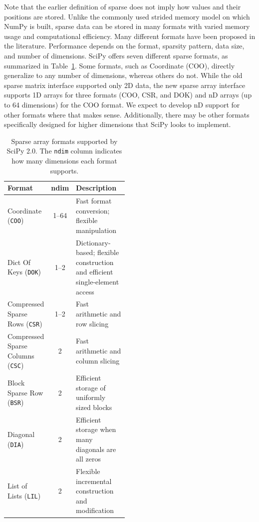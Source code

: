 \documentclass[acmsmall]{acmart}
\begin{document}
Note that the earlier definition of sparse does not imply how values and their
positions are stored.
Unlike the commonly used strided memory model on which NumPy is built,
sparse data can be stored in many formats with varied memory usage and
computational efficiency.
Many different formats have been proposed in the literature.
Performance depends on the format, sparsity pattern, data size, and number of
dimensions. SciPy offers seven
different sparse formats, as summarized in Table~\ref{tab:sparse}.
Some formats, such as Coordinate (COO), directly generalize to any number of
dimensions, whereas others do not.
While the old sparse matrix interface supported only 2D data, the new sparse array
interface supports 1D arrays for three formats (COO, CSR, and DOK) and nD arrays
(up to 64 dimensions) for the COO format. We expect to develop nD support for other
formats where that makes sense. Additionally, there may be other formats specifically
designed for higher dimensions that SciPy looks to implement.

\begin{table}
  \centering
  \caption{Sparse array formats supported by SciPy 2.0.
  The \texttt{ndim} column indicates how many dimensions each format supports.}\label{tab:sparse}
  \begin{tabular}{lcp{0.48\linewidth}@{}}
    \toprule
    Format & ndim & Description \\
    \midrule
    Coordinate (\texttt{COO}) & 1--64 & Fast format conversion; flexible manipulation \\
    Dict Of Keys (\texttt{DOK}) & 1--2 & Dictionary-based; flexible construction and \newline efficient single-element access \\
    Compressed Sparse Rows (\texttt{CSR}) & 1--2 & Fast arithmetic and row slicing \\
    Compressed Sparse Columns (\texttt{CSC}) & 2 & Fast arithmetic and column slicing \\
    Block Sparse Row (\texttt{BSR}) & 2 & Efficient storage of uniformly sized blocks \\
    Diagonal (\texttt{DIA}) & 2 & Efficient storage when many diagonals are all zeros \\
    List of Lists (\texttt{LIL}) & 2 & Flexible incremental construction and \newline modification \\
  \bottomrule
\end{tabular}
\end{table}
\end{document}
